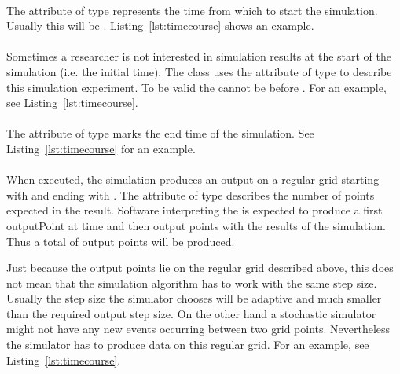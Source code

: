 \paragraph{}
\label{sec:initialTime}
The attribute  of type  represents the time from which to start the simulation. Usually this will be . Listing~\ref{lst:timecourse} shows an example. 

\paragraph{}
\label{sec:outputStartTime}
Sometimes a researcher is not interested in simulation results at the start of the simulation (i.e. the initial time). The  class uses the attribute  of type  to describe this simulation experiment. To be valid the  cannot be before . For an example, see Listing~\ref{lst:timecourse}. 

\paragraph{}
\label{sec:outputEndTime}
The attribute  of type  marks the end time of the simulation. See Listing~\ref{lst:timecourse} for an example. 

\paragraph{}
\label{sec:numberOfPoints}
When executed, the  simulation produces an output on a regular grid starting with  and ending with . The attribute   of type  describes the number of points expected in the result. Software interpreting the  is expected to produce a first outputPoint at time  and then  output points with the results of the simulation. Thus a total of  output points will be produced.

Just because the output points lie on the regular grid described above, this does not mean that the simulation algorithm has to work with the same step size. Usually the step size the simulator chooses will be adaptive and much smaller than the required output step size. On the other hand a stochastic simulator might not have any new events occurring between two grid points. Nevertheless the simulator has to produce data on this regular grid. For an example, see Listing~\ref{lst:timecourse}. 


